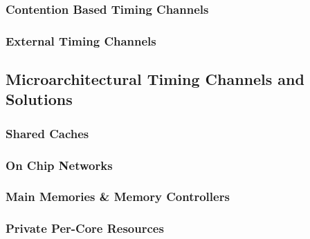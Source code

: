 \subsubsection{Contention Based Timing Channels}
\subsubsection{External Timing Channels}

\subsection{Microarchitectural Timing Channels and Solutions}
\subsubsection{Shared Caches}
\subsubsection{On Chip Networks}
\subsubsection{Main Memories \& Memory Controllers}
\subsubsection{Private Per-Core Resources}




